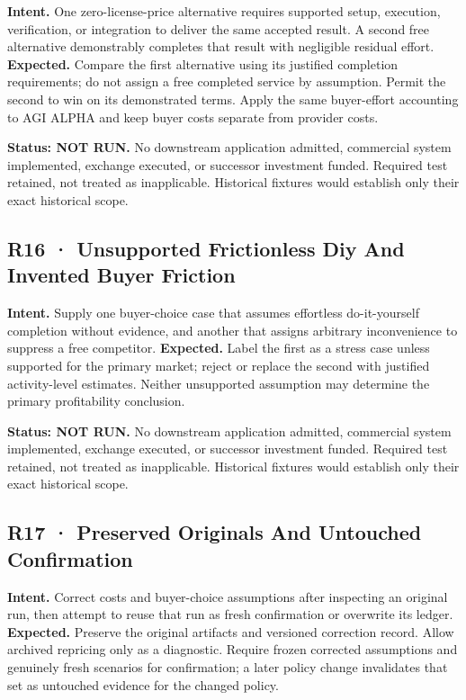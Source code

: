 \documentclass[10pt,letterpaper]{article}
\begin{document}
\textbf{Intent.} One zero-license-price alternative requires supported
setup, execution, verification, or integration to deliver the same
accepted result. A second free alternative demonstrably completes that
result with negligible residual effort. \textbf{Expected.} Compare the
first alternative using its justified completion requirements; do not
assign a free completed service by assumption. Permit the second to win
on its demonstrated terms. Apply the same buyer-effort accounting to AGI
ALPHA and keep buyer costs separate from provider costs.

\textbf{Status: NOT RUN.} No downstream application admitted, commercial
system implemented, exchange executed, or successor investment funded.
Required test retained, not treated as inapplicable. Historical fixtures
would establish only their exact historical scope.

\hypertarget{r16-unsupported-frictionless-diy-and-invented-buyer-friction}{%
\subsection{R16 · Unsupported Frictionless Diy And Invented Buyer
Friction}\label{r16-unsupported-frictionless-diy-and-invented-buyer-friction}}

\textbf{Intent.} Supply one buyer-choice case that assumes effortless
do-it-yourself completion without evidence, and another that assigns
arbitrary inconvenience to suppress a free competitor.
\textbf{Expected.} Label the first as a stress case unless supported for
the primary market; reject or replace the second with justified
activity-level estimates. Neither unsupported assumption may determine
the primary profitability conclusion.

\textbf{Status: NOT RUN.} No downstream application admitted, commercial
system implemented, exchange executed, or successor investment funded.
Required test retained, not treated as inapplicable. Historical fixtures
would establish only their exact historical scope.

\hypertarget{r17-preserved-originals-and-untouched-confirmation}{%
\subsection{R17 · Preserved Originals And Untouched
Confirmation}\label{r17-preserved-originals-and-untouched-confirmation}}

\textbf{Intent.} Correct costs and buyer-choice assumptions after
inspecting an original run, then attempt to reuse that run as fresh
confirmation or overwrite its ledger. \textbf{Expected.} Preserve the
original artifacts and versioned correction record. Allow archived
repricing only as a diagnostic. Require frozen corrected assumptions and
genuinely fresh scenarios for confirmation; a later policy change
invalidates that set as untouched evidence for the changed policy.
\end{document}
